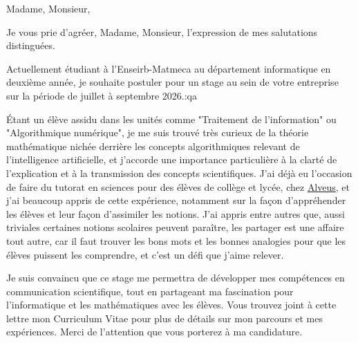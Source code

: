 \documentclass[11pt,a4paper,sans]{moderncv}
\begin{document}
\date{\today}
\opening{Madame, Monsieur,}
\closing{Je vous prie d’agréer, Madame, Monsieur, l’expression de mes salutations distinguées.}

\makelettertitle

Actuellement étudiant à l'Enseirb-Matmeca au département informatique en deuxième année, je souhaite postuler pour un stage au sein de votre entreprise sur la période de juillet à septembre 2026.:qa





Étant un élève assidu dans les unités comme "Traitement de l'information" ou "Algorithmique numérique", je me suis trouvé très curieux de la théorie mathématique nichée derrière les concepts algorithmiques relevant de l'intelligence artificielle, et j’accorde une importance particulière à la clarté de l’explication et à la transmission des concepts scientifiques. J’ai déjà eu l’occasion de faire du tutorat en sciences pour des élèves de collège et lycée, chez \href{https://www.alveusclub.com/}{Alveus}, et j’ai beaucoup appris de cette expérience, notamment sur la façon d'appréhender les élèves et leur façon d'assimiler les notions. J'ai appris entre autres que, aussi triviales certaines notions scolaires peuvent paraître, les partager est une affaire tout autre, car il faut trouver les bons mots et les bonnes analogies pour que les élèves puissent les comprendre, et c'est un défi que j'aime relever.

Je suis convaincu que ce stage me permettra de développer mes compétences en communication scientifique, tout en partageant ma fascination pour l’informatique et les mathématiques avec les élèves. Vous trouvez joint à cette lettre mon Curriculum Vitae pour plus de détails sur mon parcours et mes expériences. Merci de l'attention que vous porterez à ma candidature.

\makeletterclosing
\end{document}
